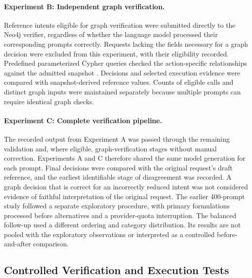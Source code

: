 \paragraph{Experiment B: Independent graph verification.}
Reference intents eligible for graph verification were submitted directly to
the Neo4j verifier, regardless of whether the language model processed their
corresponding prompts correctly. Requests lacking the fields necessary for a
graph decision were excluded from this experiment, with their eligibility
recorded. Predefined parameterized Cypher queries checked the action-specific
relationships against the admitted snapshot \cite{implNeo4jCypher}. Decisions
and selected execution evidence were compared with snapshot-derived reference
values. Counts of eligible calls and distinct graph inputs were maintained
separately because multiple prompts can require identical graph checks.

\paragraph{Experiment C: Complete verification pipeline.}
The recorded output from Experiment A was passed through the remaining
validation and, where eligible, graph-verification stages without manual
correction. Experiments A and C therefore shared the same model generation
for each prompt. Final decisions were compared with the original request's
draft reference, and the earliest identifiable stage of disagreement was
recorded. A graph decision that is correct for an incorrectly reduced intent
was not considered evidence of faithful interpretation of the original
request. The earlier 400-prompt study followed a separate exploratory procedure, with
primary formulations processed before alternatives and a provider-quota
interruption. The balanced follow-up used a different ordering and category
distribution. Its results are not pooled with the exploratory observations or
interpreted as a controlled before-and-after comparison.

\subsection{Controlled Verification and Execution Tests}
\label{sec:evaluation_controlled_experiments}

